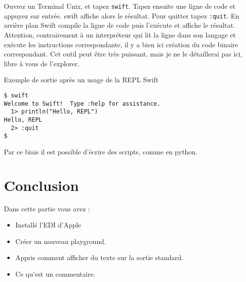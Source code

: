 Ouvrez un Terminal Unix, et tapez \verb"swift".
Tapez ensuite une ligne de code et appuyez sur entrée.
swift affiche alors le résultat.
Pour quitter tapez \verb":quit".
En arrière plan Swift compile la ligne de code
puis l'exécute et affiche le résultat.
Attention, contrairement à un interpréteur qui lit la ligne dans son langage
et exécute les instructions correspondante,
il y a bien ici création du code binaire correspondant.
Cet outil peut être très puissant,
mais je ne le détaillerai pas ici, libre à vous de l’explorer.
\begin{listing}[H]
\caption{Exemple de sortie après un usage de la REPL Swift}
\begin{verbatim}
$ swift
Welcome to Swift!  Type :help for assistance.
  1> println("Hello, REPL")
Hello, REPL
  2> :quit
$
\end{verbatim}
\end{listing}
Par ce biais il est possible d'écrire des scripts, comme en python.



\section*{Conclusion}
{}
Dans cette partie vous avez :
\begin{itemize}
\item Installé l'EDI d'Apple
\item Créer un nouveau playground.
\item Appris comment afficher du texte sur la sortie standard.
\item Ce qu'est un commentaire.
\end{itemize}
